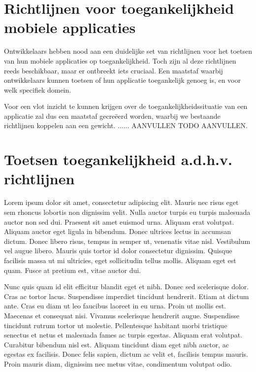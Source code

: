 \section{Richtlijnen voor toegankelijkheid mobiele applicaties}
\label{section:Richtlijnen voor toegankelijkheid mobiele applicaties}
Ontwikkelaars hebben nood aan een duidelijke set van richtlijnen voor het toetsen van hun mobiele applicaties op toegankelijkheid. Toch zijn al deze richtlijnen reeds beschikbaar, maar er ontbreekt iets cruciaal. Een maatstaf waarbij ontwikkelaars kunnen toetsen of hun applicatie toegankelijk genoeg is, en voor welk specifiek domein.

Voor een vlot inzicht te kunnen krijgen over de toegankelijkheidssituatie van een applicatie zal dus een maatstaf gecreëerd worden, waarbij we bestaande richtlijnen koppelen aan een gewicht. ...... AANVULLEN TODO AANVULLEN. 

\section{Toetsen toegankelijkheid  a.d.h.v. richtlijnen}
\label{section:Toetsen toegankelijkheid a.d.h.v. richtlijnen}
Lorem ipsum dolor sit amet, consectetur adipiscing elit. Mauris nec risus eget sem rhoncus lobortis non dignissim velit. Nulla auctor turpis eu turpis malesuada auctor non sed dui. Praesent sit amet euismod urna. Aliquam erat volutpat. Aliquam auctor eget ligula in bibendum. Donec ultrices lectus in accumsan dictum. Donec libero risus, tempus in semper ut, venenatis vitae nisl. Vestibulum vel augue libero. Mauris quis tortor id dolor consectetur dignissim. Quisque facilisis massa ut mi ultricies, eget sollicitudin tellus mollis. Aliquam eget est quam. Fusce at pretium est, vitae auctor dui.

Nunc quis quam id elit efficitur blandit eget et nibh. Donec sed scelerisque dolor. Cras ac tortor lacus. Suspendisse imperdiet tincidunt hendrerit. Etiam at dictum ante. Cras eu diam ut leo faucibus laoreet in eu urna. Proin ut mollis est. Maecenas et consequat nisi. Vivamus scelerisque hendrerit augue. Suspendisse tincidunt rutrum tortor ut molestie. Pellentesque habitant morbi tristique senectus et netus et malesuada fames ac turpis egestas. Aliquam erat volutpat. Curabitur bibendum nisl est. Aliquam tincidunt diam eget nibh auctor, ac egestas ex facilisis. Donec felis sapien, dictum ac velit et, facilisis tempus mauris. Proin mauris diam, dignissim nec metus vitae, condimentum volutpat odio.

